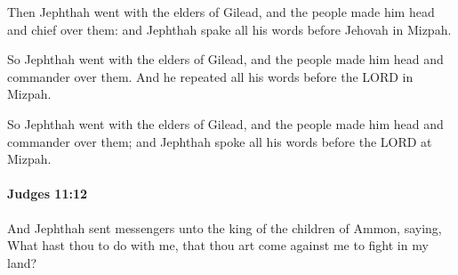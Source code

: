 			\begin{versebox}
					\item[BHS] 
					\item[ASV] Then Jephthah went with the elders of Gilead, and the people made him head and chief over them: and Jephthah spake all his words before Jehovah in Mizpah.
					\item[NIV] So Jephthah went with the elders of Gilead, and the people made him head and commander over them. And he repeated all his words before the LORD in Mizpah.
					\item[NRSV] So Jephthah went with the elders of Gilead, and the people made him head and commander over them; and Jephthah spoke all his words before the LORD at Mizpah.
			\end{versebox}

		\paragraph{Judges 11:12} %
			\label{JUDGES-11-12}

			And Jephthah sent messengers unto the king of the children of Ammon, saying, What hast thou to do with me, that thou art come against me to fight in my land?

